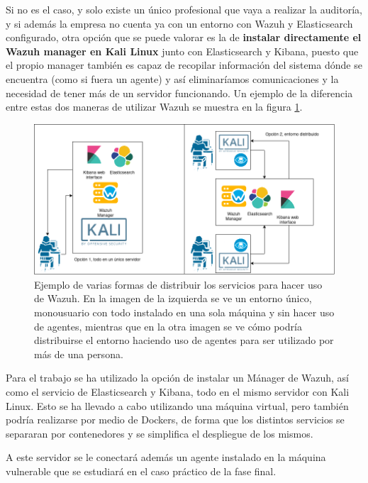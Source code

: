 Si no es el caso, y solo existe un único profesional que vaya a realizar la auditoría, y si además la empresa no cuenta ya con un entorno con Wazuh y Elasticsearch configurado, otra opción que se puede valorar es la de \textbf{instalar directamente el Wazuh manager en Kali Linux} junto con Elasticsearch y Kibana, puesto que el propio manager también es capaz de recopilar información del sistema dónde se encuentra (como si fuera un agente) y así eliminaríamos comunicaciones y la necesidad de tener más de un servidor funcionando. Un ejemplo de la diferencia entre estas dos maneras de utilizar Wazuh se muestra en la figura  \ref{entorno_ejemplos}.

\begin{figure}[!hbt]
  \centering
  \includegraphics[width=\textwidth]{imagenes/entorno.png}
  \caption{Ejemplo de varias formas de distribuir los servicios para hacer uso de Wazuh. En la imagen de la izquierda se ve un entorno único, monousuario con todo instalado en una sola máquina y sin hacer uso de agentes, mientras que en la otra imagen se ve cómo podría distribuirse el entorno haciendo uso de agentes para ser utilizado por más de una persona.}
  \label{entorno_ejemplos}
\end{figure}


Para el trabajo se ha utilizado la opción de instalar un Mánager de Wazuh, así como el servicio de Elasticsearch y Kibana, todo en el mismo servidor con Kali Linux. Esto se ha llevado a cabo utilizando una máquina virtual, pero también podría realizarse por medio de Dockers, de forma que los distintos servicios se separaran por contenedores y se simplifica el despliegue de los mismos.

A este servidor se le conectará además un agente instalado en la máquina vulnerable que se estudiará en el caso práctico de la fase final.